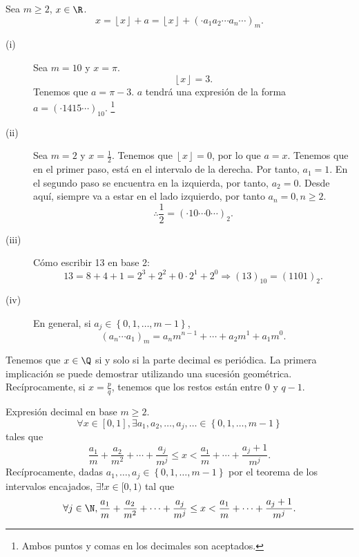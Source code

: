 \begin{notation}
\normalfont Sea $\displaystyle m \geq 2 $, $\displaystyle x \in \R $.
\[x = \left\lfloor x \right\rfloor + a = \left\lfloor x \right\rfloor + \left( \cdot a_{1}a_{2} \cdots a_{n} \cdots \right)_{m} .\]
\end{notation}

\begin{eg}
\normalfont 
\begin{description}
\item[(i)] Sea $\displaystyle m = 10 $ y $\displaystyle x = \pi  $. 
\[\left\lfloor x \right\rfloor = 3 .\]
Tenemos que $\displaystyle a = \pi - 3 $. $\displaystyle a $ tendrá una expresión de la forma $\displaystyle a = \left( \cdot 1415 \cdots\right)_{10} $. \footnote{Ambos puntos y comas en los decimales son aceptados.}  
\item[(ii)] Sea $\displaystyle m = 2 $ y $\displaystyle x = \frac{1}{2} $. Tenemos que $\displaystyle \left\lfloor x \right\rfloor = 0 $, por lo que $\displaystyle a = x $. Tenemos que en el primer paso, está en el intervalo de la derecha. Por tanto, $\displaystyle a_{1} = 1 $. En el segundo paso se encuentra en la izquierda, por tanto, $\displaystyle a_{2} = 0 $. Desde aquí, siempre va a estar en el lado izquierdo, por tanto $\displaystyle a_{n} = 0, n \geq 2 $. 
	\[\therefore \frac{1}{2} = \left( \cdot 10 \cdots 0 \cdots \right)_{2} .\]
\item[(iii)] Cómo escribir 13 en base 2:
	\[13 = 8 + 4 + 1 = 2^{3} + 2^{2} + 0 \cdot 2^{1}+ 2^{0} \Rightarrow (13)_{10} = \left(1101\right)_{2} .\]
\item[(iv)] En general, si $\displaystyle a_{j}\in \left\{ 0, 1, \ldots, m - 1 \right\}  $, 
	\[\left(a_{n} \cdots a_{1}\right)_{m} = a_{n}m^{n-1} + \cdots + a_{2}m^{1}+a_{1}m^{0} .\]
\end{description}
\end{eg}

\begin{observation}
\normalfont Tenemos que $\displaystyle x \in \Q $ si y solo si la parte decimal es periódica. La primera implicación se puede demostrar utilizando una sucesión geométrica. Recíprocamente, si $\displaystyle x = \frac{p}{q} $, tenemos que los restos están entre 0 y $\displaystyle q -1 $.
\end{observation}

Expresión decimal en base $\displaystyle m \geq 2 $. 
\[\forall x \in \left[0,1\right], \exists a_{1}, a_{2}, \ldots, a_{j}, \ldots \in \left\{ 0,1, \ldots, m -1 \right\}  \]
tales que
\[\frac{a_{1}}{m} + \frac{a_{2}}{m^{2}} + \cdots + \frac{a_{j}}{m^{j}} \leq x < \frac{a_{1}}{m} + \cdots + \frac{a_{j}+1}{m^{j}} .\]
Recíprocamente, dadas $\displaystyle a_{1}, \ldots, a_{j}\in \left\{ 0,1, \ldots, m -1\right\}  $ por el teorema de los intervalos encajados, $\displaystyle \exists! x \in [0,1) $ tal que 
\[\forall j \in \N, \frac{a_{1}}{m} + \frac{a_{2}}{m^{2}} + \cdots + \frac{a_{j}}{m^{j}} \leq x < \frac{a_{1}}{m} + \cdots + \frac{a_{j}+1}{m^{j}}  .\]

